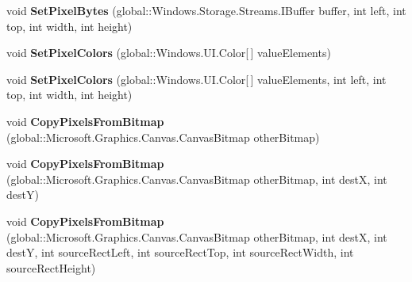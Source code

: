 \begin{DoxyCompactItemize}
\item 
\mbox{\label{interface_microsoft_1_1_graphics_1_1_canvas_1_1_i_canvas_bitmap_a593c5894545aa39d6cf008b46bef4972}} 
void {\bfseries Set\+Pixel\+Bytes} (global\+::\+Windows.\+Storage.\+Streams.\+I\+Buffer buffer, int left, int top, int width, int height)
\item 
\mbox{\label{interface_microsoft_1_1_graphics_1_1_canvas_1_1_i_canvas_bitmap_a925c9f849cf70be981d86d4e4aad1bd0}} 
void {\bfseries Set\+Pixel\+Colors} (global\+::\+Windows.\+U\+I.\+Color\mbox{[}$\,$\mbox{]} value\+Elements)
\item 
\mbox{\label{interface_microsoft_1_1_graphics_1_1_canvas_1_1_i_canvas_bitmap_ad139947e5dfa06e8b880c01a19016cf7}} 
void {\bfseries Set\+Pixel\+Colors} (global\+::\+Windows.\+U\+I.\+Color\mbox{[}$\,$\mbox{]} value\+Elements, int left, int top, int width, int height)
\item 
\mbox{\label{interface_microsoft_1_1_graphics_1_1_canvas_1_1_i_canvas_bitmap_a6e4c4209ff55c072d09a51c00a9d4653}} 
void {\bfseries Copy\+Pixels\+From\+Bitmap} (global\+::\+Microsoft.\+Graphics.\+Canvas.\+Canvas\+Bitmap other\+Bitmap)
\item 
\mbox{\label{interface_microsoft_1_1_graphics_1_1_canvas_1_1_i_canvas_bitmap_a5ab0cddef05eb80cffded7b872aacc34}} 
void {\bfseries Copy\+Pixels\+From\+Bitmap} (global\+::\+Microsoft.\+Graphics.\+Canvas.\+Canvas\+Bitmap other\+Bitmap, int destX, int destY)
\item 
\mbox{\label{interface_microsoft_1_1_graphics_1_1_canvas_1_1_i_canvas_bitmap_a6300f60ab1f71c5032c2680ae66ec957}} 
void {\bfseries Copy\+Pixels\+From\+Bitmap} (global\+::\+Microsoft.\+Graphics.\+Canvas.\+Canvas\+Bitmap other\+Bitmap, int destX, int destY, int source\+Rect\+Left, int source\+Rect\+Top, int source\+Rect\+Width, int source\+Rect\+Height)
\item 
\mbox{\label{interface_microsoft_1_1_graphics_1_1_canvas_1_1_i_canvas_bitmap_af2b4e8d31f7d4a3d849dc0f156a59a7e}} 

\end{DoxyCompactItemize}
